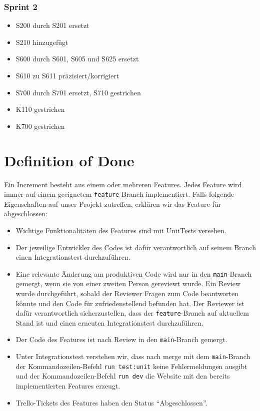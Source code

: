 \documentclass[titlepage]{scrartcl}
\begin{document}
\subsubsection{Sprint 2}
\begin{itemize}
	\item S200 durch S201 ersetzt
	\item S210 hinzugefügt
	\item S600 durch S601, S605 und S625 ersetzt
	\item S610 zu S611 präzisiert/korrigiert
	\item S700 durch S701 ersetzt, S710 gestrichen
	\item K110 gestrichen
	\item K700 gestrichen
\end{itemize}
	
\section{Definition of Done}%
Ein Increment besteht aus einem oder mehreren Features.
Jedes Feature wird immer auf einem geeignetem \texttt{feature}-Branch implementiert.
Falls folgende Eigenschaften auf unser Projekt zutreffen, erklären wir das Feature für abgeschlossen:
\begin{itemize}
	\item Wichtige Funktionalitäten des Features sind mit UnitTests versehen.
	\item Der jeweilige Entwickler des Codes ist dafür verantwortlich auf seinem Branch einen Integrationstest durchzuführen.
	\item Eine relevante Änderung am produktiven Code wird nur in den \texttt{main}-Branch gemergt, wenn sie von einer zweiten Person gereviewt wurde.
			Ein Review wurde durchgeführt, sobald der Reviewer Fragen zum Code beantworten könnte und den Code für zufriedenstellend befunden hat.
			Der Reviewer ist dafür verantwortlich sicherzustellen, dass der \texttt{feature}-Branch auf aktuellem Stand ist und einen erneuten Integrationstest durchzuführen.
	\item Der Code des Features ist nach Review in den \texttt{main}-Branch gemergt.
	\item Unter Integrationstest verstehen wir, dass nach merge mit dem \texttt{main}-Branch der Kommandozeilen-Befehl \texttt{run test:unit} keine Fehlermeldungen ausgibt und der Kommandozeilen-Befehl \texttt{run dev} die Website mit den bereits implementierten Features erzeugt.
	\item Trello-Tickets des Features haben den Status "`Abgeschlossen"'.
\end{itemize}
\end{document}
